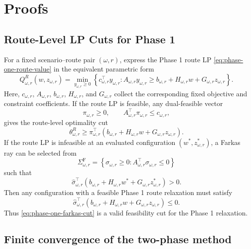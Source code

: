 \FloatBarrier
\section{Proofs}
\label{app:proofs}

\subsection{Route-Level LP Cuts for Phase 1}
\label{app:route-lp-cuts}

For a fixed scenario--route pair $(\omega,r)$, express the Phase 1 route LP \eqref{eq:phase-one-route-value} in the equivalent parametric form
\[
    Q^R_{\omega,r}(w,z_{\omega,r})
    =
    \min_{y_{\omega,r}\geq 0}
    \left\{
    c_{\omega,r}^{\top} y_{\omega,r}:
    A_{\omega,r} y_{\omega,r}
    \geq
    b_{\omega,r}
    +
    H_{\omega,r} w
    +
    G_{\omega,r} z_{\omega,r}
    \right\}.
\]
Here, $c_{\omega,r}$, $A_{\omega,r}$, $b_{\omega,r}$, $H_{\omega,r}$, and $G_{\omega,r}$ collect the corresponding fixed objective and constraint coefficients.
If the route LP is feasible, any dual-feasible vector
\[
    \pi_{\omega,r}\ge0,
    \qquad
    A_{\omega,r}^{\top}\pi_{\omega,r}\le c_{\omega,r},
\]
gives the route-level optimality cut
\[
    \theta_{\omega,r}^R
    \ge
    \pi_{\omega,r}^{\top}
    \left(
    b_{\omega,r}
    +
    H_{\omega,r}w
    +
    G_{\omega,r}z_{\omega,r}
    \right).
\]
If the route LP is infeasible at an evaluated configuration $(w^*,z^*_{\omega,r})$, a Farkas ray can be selected from
\[
    \Sigma_{\omega,r}^{\mathrm F}
    =
    \left\{
    \sigma_{\omega,r}\geq 0:
    A_{\omega,r}^{\top}\sigma_{\omega,r}\leq 0
    \right\}
\]
such that
\[
    \hat{\sigma}_{\omega,r}^{\top}
    \left(
    b_{\omega,r}
    +
    H_{\omega,r}w^*
    +
    G_{\omega,r}z^*_{\omega,r}
    \right)
    >
    0.
\]
Then any configuration with a feasible Phase 1 route relaxation must satisfy
\begin{equation}
    \hat{\sigma}_{\omega,r}^{\top}
    \left(
    b_{\omega,r}
    +
    H_{\omega,r}w
    +
    G_{\omega,r}z_{\omega,r}
    \right)
    \leq
    0.
    \label{eq:phase-one-farkas-cut}
\end{equation}
Thus \eqref{eq:phase-one-farkas-cut} is a valid feasibility cut for the Phase 1 relaxation.

\subsection{Finite convergence of the two-phase method}
\label{app:finite-convergence}

